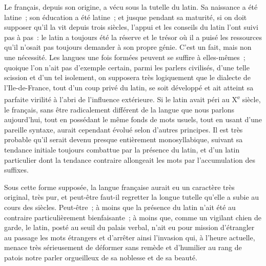 \documentclass[french,twoside]{book} %
\newcommand\chaptercont{} %
\begin{document}
\chaptercont
\noindent Le français, depuis son origine, a vécu sous la tutelle du latin. Sa naissance a été latine ; son éducation a été latine ; et jusque pendant sa maturité, si on doit supposer qu’il la vit depuis trois siècles, l’appui et les conseils du latin l’ont suivi pas à pas : le latin a toujours été la réserve et le trésor où il a puisé les ressources qu’il n’osait pas toujours demander à son propre génie. C’est un fait, mais non une nécessité. Les langues une fois formées peuvent se suffire à elles-mêmes ; quoique l’on n’ait pas d’exemple certain, parmi les parlers civilisés, d’une telle scission et d’un tel isolement, on supposera très logiquement que le dialecte de l’Ile-de-France, tout d’un coup privé du latin, se soit développé et ait atteint sa parfaite virilité à l’abri de l’influence extérieure. Si le latin avait péri au X\textsuperscript{e} siècle, le français, sans être radicalement différent de la langue que nous parlons aujourd’hui, tout en possédant le même fonds de mots usuels, tout en usant d’une pareille syntaxe, aurait cependant évolué selon d’autres principes. Il est très probable qu’il serait devenu presque entièrement monosyllabique, suivant sa tendance initiale toujours combattue par la présence du latin, et d’un latin particulier dont la tendance contraire allongeait les mots par l’accumulation des suffixes.\par
Sous cette forme supposée, la langue française aurait eu un caractère très original, très pur, et peut-être faut-il regretter la longue tutelle qu’elle a subie au cours des siècles. Peut-être ; à moins que la présence du latin n’ait été au contraire particulièrement bienfaisante ; à moins que, comme un vigilant chien de garde, le latin, posté au seuil du palais verbal, n’ait eu pour mission d’étrangler au passage les mots étrangers et d’arrêter ainsi l’invasion qui, à l’heure actuelle, menace très sérieusement de déformer sans remède et d’humilier au rang de patois notre parler orgueilleux de sa noblesse et de sa beauté.\par
\end{document}
